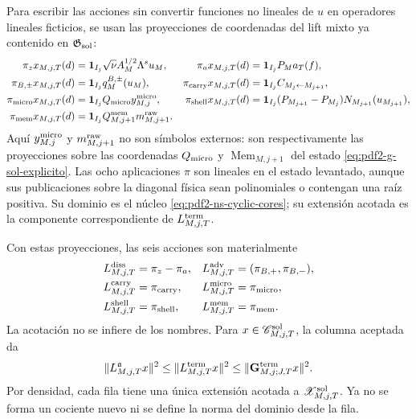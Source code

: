 Para escribir las acciones sin convertir funciones no lineales de $u$ en
operadores lineales ficticios, se usan las proyecciones de coordenadas del lift
mixto ya contenido en $\mathfrak G_{\rm sol}$:
\begin{equation}\label{eq:pdf2-ns-row-coordinate-readers}
 \begin{aligned}
 \pi_zx_{M,j,T}(d)&=\mathbf1_{I_j}\sqrt\nu A_M^{1/2}\Lambda^su_M,&
 \pi_ax_{M,j,T}(d)&=\mathbf1_{I_j}P_Ma_T(f),\\
 \pi_{B,\pm}x_{M,j,T}(d)&=\mathbf1_{I_j}q_M^{B,\pm}(u_M),&
 \pi_{\rm carry}x_{M,j,T}(d)&=\mathbf1_{I_j}C_{M_j\leftarrow M_{j+1}},\\
 \pi_{\rm micro}x_{M,j,T}(d)&=\mathbf1_{I_j}Q_{\rm micro}y^{\rm micro}_{M,j},&
 \pi_{\rm shell}x_{M,j,T}(d)&=\mathbf1_{I_j}
 (P_{M_{j+1}}-P_{M_j})N_{M_{j+1}}(u_{M_{j+1}}),\\
 \pi_{\rm mem}x_{M,j,T}(d)&=\mathbf1_{I_j}
 Q^{\rm mem}_{M,j+1}m^{\rm raw}_{M,j+1}.&&
 \end{aligned}
\end{equation}
Aquí $y^{\rm micro}_{M,j}$ y $m^{\rm raw}_{M,j+1}$ no son símbolos
externos: son respectivamente las proyecciones sobre las coordenadas
$Q_{\rm micro}$ y $\operatorname{Mem}_{M,j+1}$ del estado
\eqref{eq:pdf2-g-sol-explicito}. Las ocho aplicaciones $\pi$ son lineales en
el estado levantado, aunque sus publicaciones sobre la diagonal física sean
polinomiales o contengan una raíz positiva. Su dominio es el núcleo
\eqref{eq:pdf2-ns-cyclic-cores}; su extensión acotada es la componente
correspondiente de $L_{M,j,T}^{\rm term}$.

Con estas proyecciones, las seis acciones son materialmente
\begin{equation}\label{eq:pdf2-ns-six-loss-actions}
 \begin{aligned}
 L^{\rm diss}_{M,j,T}&=\pi_z-\pi_a,&
 L^{\rm adv}_{M,j,T}&=(\pi_{B,+},\pi_{B,-}),\\
 L^{\rm carry}_{M,j,T}&=\pi_{\rm carry},&
 L^{\rm micro}_{M,j,T}&=\pi_{\rm micro},\\
 L^{\rm shell}_{M,j,T}&=\pi_{\rm shell},&
 L^{\rm mem}_{M,j,T}&=\pi_{\rm mem}.
 \end{aligned}
\end{equation}
La acotación no se infiere de los nombres. Para
$x\in\mathscr C_{M,j,T}^{\rm sol}$, la columna aceptada da
\begin{equation}\label{eq:pdf2-ns-row-boundedness}
 \|L_{M,j,T}^{\mathfrak a}x\|^2
 \le\|L_{M,j,T}^{\rm term}x\|^2
 \le\|\mathbf G_{M,j;J,T}^{\rm term}x\|^2.
\end{equation}
Por densidad, cada fila tiene una única extensión acotada a
$\mathscr X_{M,j,T}^{\rm sol}$. Ya no se forma un cociente nuevo ni se define
la norma del dominio desde la fila.


